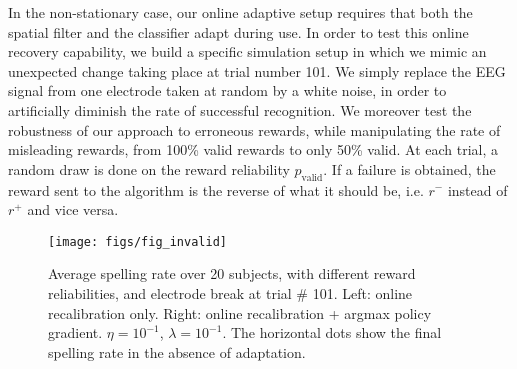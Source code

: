 \documentclass[conference]{IEEEtran}
\begin{document}
In the non-stationary case, our online adaptive setup requires that both the spatial filter and 
the classifier adapt during  use.
In order to test this online recovery capability, we build a specific simulation setup in which we mimic an unexpected 
change taking place at trial number 101. We simply replace the EEG signal from one electrode taken at random 
by a white noise, in order to artificially diminish the rate of successful recognition.
We moreover test the robustness of our approach to erroneous rewards, while manipulating
the rate of misleading rewards, from 100\% valid rewards to only 50\% valid.
At each trial, a random draw is done on the reward reliability $p_\text{valid}$. If a failure is obtained, 
the reward sent to the algorithm is the reverse of what it should be, i.e. $r^-$ instead of $r^+$ and vice versa.

\begin{figure}
\centerline{
 \texttt{[image: figs/fig\_invalid]}
}
\caption{Average spelling rate over 20 subjects, with different reward reliabilities, and electrode break
at trial \# 101. Left: online recalibration only. Right: online recalibration + argmax policy gradient.
$\eta = 10^{-1}$, $\lambda = 10^{-1}$. The horizontal dots show the final spelling rate in the absence of 
adaptation.}
\label{fig:invalid}
\end{figure}
\end{document}
